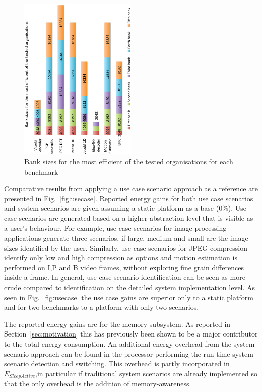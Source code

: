 \documentclass[a4paper,conference]{IEEEtran}
\begin{document}
\begin{figure}[!t]
\centering
\includegraphics[angle=270, width=0.50\textwidth]{Images/banks.ps}
\caption{Bank sizes for the most efficient of the tested organisations for each benchmark}
\label{fig:banks}
\end{figure}


Comparative results from applying a use case scenario approach as a reference are presented in Fig.~\ref{fig:usecase}. Reported energy gains for both use case scenarios and system scenarios are given assuming a static platform as a base (0\%). Use case scenarios are generated based on a higher abstraction level that is visible as a user's behaviour. For example, use case scenarios for image processing applications generate three scenarios, if large, medium and small are the image sizes identified by the user. Similarly, use case scenarios for JPEG compression identify only low and high compression as options and motion estimation is performed on I,P and B video frames, without exploring fine grain differences inside a frame. In general, use case scenario identification can be seen as more crude compared to identification on the detailed system implementation level. As seen in Fig.~\ref{fig:usecase} the use case gains are superior only to a static platform and for two benchmarks to a platform with only two scenarios.  

The reported energy gains are for the memory subsystem. As reported in Section~\ref{sec:motivation} this has previously been shown to be a major contributor to the total energy consumption. An additional energy overhead from the system scenario approach can be found in the processor performing the run-time system scenario detection and switching. This overhead is partly incorporated in $E_{SleepActive}$,in particular if traditional system scenarios are already implemented so that the only overhead is the addition of memory-awareness.
\end{document}
